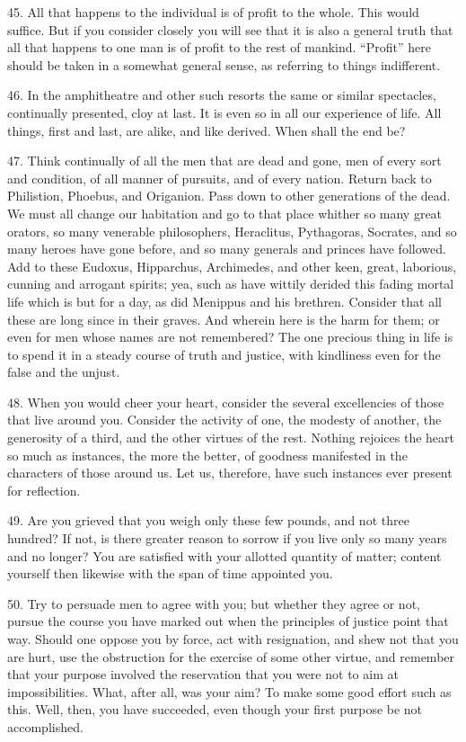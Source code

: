 \documentclass{book}
\begin{document}
45. All that happens to the individual is of profit to the whole. This
would suffice. But if you consider closely you will see that it is
also a general truth that all that happens to one man is of profit to
the rest of mankind. ``Profit'' here should be taken in a somewhat
general sense, as referring to things indifferent.

46. In the amphitheatre and other such resorts the same or similar
spectacles, continually presented, cloy at last. It is even so in all
our experience of life. All things, first and last, are alike, and
like derived. When shall the end be?

47. Think continually of all the men that are dead and gone, men of
every sort and condition, of all manner of pursuits, and of every
nation. Return back to Philistion, Phoebus, and Origanion. Pass down
to other generations of the dead. We must all change our habitation
and go to that place whither so many great orators, so many venerable
philosophers, Heraclitus, Pythagoras, Socrates, and so many heroes
have gone before, and so many generals and princes have followed. Add
to these Eudoxus, Hipparchus, Archimedes, and other keen, great,
laborious, cunning and arrogant spirits; yea, such as have wittily
derided this fading mortal life which is but for a day, as did
Menippus and his brethren. Consider that all these are long since in
their graves. And wherein here is the harm for them; or even for men
whose names are not remembered? The one precious thing in life is to
spend it in a steady course of truth and justice, with kindliness even
for the false and the unjust.

48. When you would cheer your heart, consider the several excellencies
of those that live around you. Consider the activity of one, the
modesty of another, the generosity of a third, and the other virtues
of the rest. Nothing rejoices the heart so much as instances, the more
the better, of goodness manifested in the characters of those around
us. Let us, therefore, have such instances ever present for
reflection.

49. Are you grieved that you weigh only these few pounds, and not
three hundred? If not, is there greater reason to sorrow if you live
only so many years and no longer? You are satisfied with your allotted
quantity of matter; content yourself then likewise with the span of
time appointed you.

50. Try to persuade men to agree with you; but whether they agree or
not, pursue the course you have marked out when the principles of
justice point that way. Should one oppose you by force, act with
resignation, and shew not that you are hurt, use the obstruction for
the exercise of some other virtue, and remember that your purpose
involved the reservation that you were not to aim at impossibilities.
What, after all, was your aim? To make some good effort such as
this. Well, then, you have succeeded, even though your first purpose
be not accomplished.
\end{document}
